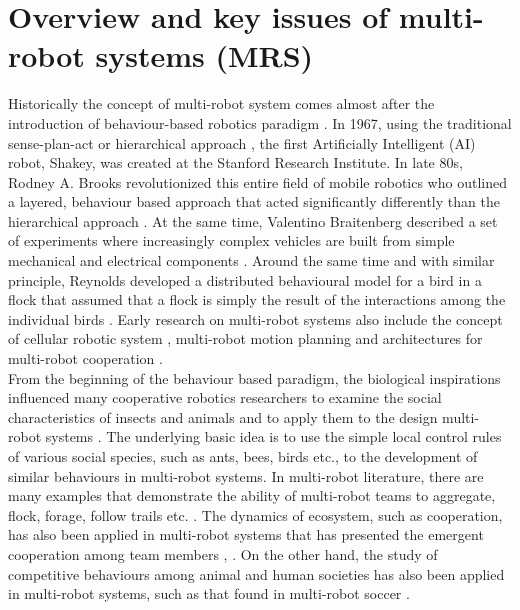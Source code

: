 \section{Overview and key issues of multi-robot systems (MRS)}
\label{bg:mrs}
Historically the concept of multi-robot system comes almost after the introduction of behaviour-based robotics paradigm \cite{Brooks1986,Arkin1990}. In 1967, using the traditional sense-plan-act or hierarchical approach \cite{Murphy2000}, the first Artificially Intelligent (AI) robot, Shakey, was created at the Stanford Research Institute. In late 80s, Rodney A. Brooks revolutionized this entire field of mobile robotics who outlined a layered, behaviour based approach that acted significantly differently than the hierarchical approach \cite{Brooks1986}. At the same time, Valentino Braitenberg described a set of experiments where increasingly complex vehicles are built from simple mechanical and electrical components \cite{Braitenberg1984}. Around the same time and with similar principle, Reynolds developed a distributed behavioural model for a bird in a flock that assumed that a flock is simply the result of the interactions among the individual birds \cite{Reynolds1987}. Early research on multi-robot systems also include the concept of cellular robotic system \cite{Fukuda+1987}, \cite{Beni1988} multi-robot motion planning \cite{Arai+1989,Premvuti+1990,Wang1989} and architectures for multi-robot cooperation \cite{Asama+1989}.\\
%
From the beginning of the behaviour based paradigm, the biological inspirations influenced many cooperative robotics researchers to examine the social characteristics of insects and animals and to apply them to the design multi-robot systems \cite{Arkin1998}. The underlying basic idea is to use the simple local control rules of various social species, such as ants, bees, birds etc., to the development of similar behaviours in multi-robot systems. In multi-robot literature, there are many examples that demonstrate the ability of multi-robot teams to aggregate, flock, forage, follow trails etc. \cite{Bonabeau+1999,Mataric1994}. The dynamics of ecosystem, such as cooperation, has also been applied in multi-robot systems that has presented the emergent cooperation among team members \cite{Mcfarland1994}, \cite{Martinoli+1996}. On the other hand, the study of competitive behaviours among animal and human societies has also been applied in multi-robot systems, such as that found in multi-robot soccer \cite{Asada+1999}.\\
